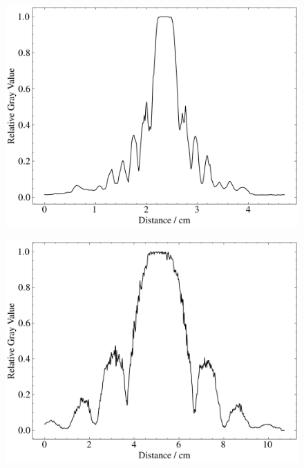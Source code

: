 \begin{figure}[htbp]
	\begin{minipage}[ht]{0.48\hsize}\centering
		\includegraphics[width=\linewidth]{src/figures/result/circle_data_amp.png}
		\label{subfig:circle_amp}
	\end{minipage}
	\begin{minipage}[ht]{0.48\hsize}\centering
		\includegraphics[width=\linewidth]{src/figures/result/ss1_data_amp.png}
		\label{subfig:ss1_amp}
	\end{minipage}
	\begin{minipage}[ht]{0.48\hsize}\centering

\end{minipage}
\end{figure}
